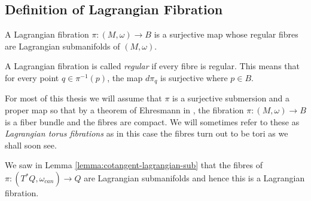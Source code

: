 \subsection{Definition of Lagrangian Fibration}
\begin{definition}
    A Lagrangian fibration $\pi: (M, \omega) \to B $ is a surjective map whose regular fibres are Lagrangian
    submanifolds of $(M, \omega)$.
\end{definition}
\begin{definition}
    A Lagrangian fibration is called \emph{regular} if every fibre is regular. This means that for every point $q \in \pi^{-1}(p)$, the map $d\pi_q$ is surjective where $p \in B$.
\end{definition}
\begin{remark}

    For most of this thesis we will assume that $\pi$ is a surjective submersion
    and a proper map so that by a theorem of Ehresmann in \cite{Ehresmann1951}, the
    fibration $\pi : (M, \omega) \to B$ is a fiber bundle and the fibres are
    compact. We will sometimes refer to these as \emph{Lagrangian torus fibrations}
    as in this case the fibres turn out to be tori as we shall soon see.
\end{remark}

\begin{eg}
    We saw in Lemma \ref{lemma:cotangent-lagrangian-sub} that the fibres of $\pi: (T^*Q, \omega_{can}) \to Q$ are Lagrangian submanifolds
    and hence this is a Lagrangian fibration.
\end{eg}

